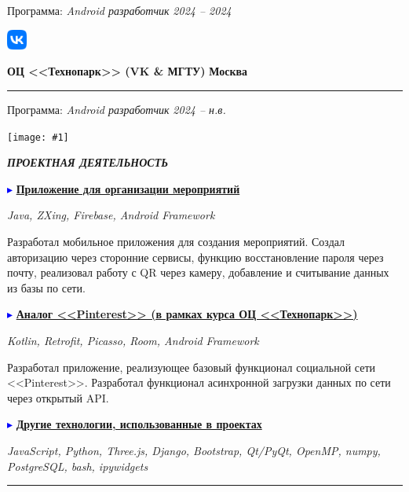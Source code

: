 \documentclass[a4paper, 10pt]{extarticle}
\newcommand{\Sep}{
    \noindent\hdashrule[0.5ex]{\columnwidth}{1pt}{1mm 1pt}
}
\newcommand{\SubTitle}[2]{
    \parbox{1.75em}{
        \texttt{[image: \#1]}
    }\textbf{\textit{\MakeUppercase{#2}}}
}
\begin{document}
\begin{paracol}{2}
\begin{rightcolumn}
{                Программа: \textit{Android разработчик}
                \hfill \textit{2024 -- 2024} 
            }
            \vspace{1em}

            \noindent\parbox{0.1\columnwidth}{
                \includegraphics[width=0.05\textwidth]{img/vk_logo.png}
            }
            \parbox{0.89\columnwidth}{
                \textbf{ОЦ <<Технопарк>> (VK \& МГТУ)}
                \hfill \textbf{Москва}
                \hrule
                \vspace{0.5em}

                Программа: \textit{Android разработчик}
                \hfill \textit{2024 -- н.в.} 
            }
            \vspace{-1.1em}

            \Sep
            \begin{center}
                \SubTitle{img/project.png}{Проектная деятельность}
            \end{center}
            \vspace{-1em}
            \textcolor{blue}{$\blacktriangleright$} 
            \textbf{\underline{Приложение для организации мероприятий}}
            
            \noindent\textit{Java, ZXing, Firebase, Android Framework}
            
            \noindent Разработал мобильное приложения для создания мероприятий.
            Создал авторизацию через сторонние сервисы, функцию восстановление пароля через почту,
            реализовал работу с QR через камеру, добавление и считывание данных из базы по сети.
            
            \noindent\textcolor{blue}{$\blacktriangleright$} 
            \textbf{\underline{Аналог <<Pinterest>> (в рамках курса ОЦ <<Технопарк>>)}}
            
            \noindent\textit{Kotlin, Retrofit, Picasso, Room, Android Framework}
            
            \noindent Разработал приложение, реализующее базовый функционал социальной сети <<Pinterest>>.
            Разработал функционал асинхронной загрузки данных по сети через открытый API.

            \noindent\textcolor{blue}{$\blacktriangleright$}
            \noindent\textbf{\underline{Другие технологии, использованные в проектах}}

            \noindent\textit{JavaScript, Python, Three.js, Django, Bootstrap, Qt/PyQt, OpenMP, numpy, PostgreSQL, bash, ipywidgets}
        \end{rightcolumn}
    \end{paracol}
    \vspace{3em}

    \noindent\rule{\textwidth}{1.25pt}
\end{document}
